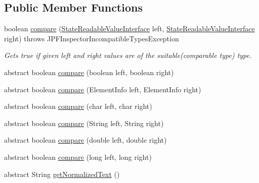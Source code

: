 \subsection*{Public Member Functions}
\begin{DoxyCompactItemize}
\item 
boolean \hyperlink{classgov_1_1nasa_1_1jpf_1_1inspector_1_1server_1_1programstate_1_1relop_1_1_rel_op_equal_base_a89a8988e7ff80fd175542cf45f5f18d3}{compare} (\hyperlink{interfacegov_1_1nasa_1_1jpf_1_1inspector_1_1server_1_1programstate_1_1_state_readable_value_interface}{State\+Readable\+Value\+Interface} left, \hyperlink{interfacegov_1_1nasa_1_1jpf_1_1inspector_1_1server_1_1programstate_1_1_state_readable_value_interface}{State\+Readable\+Value\+Interface} right)  throws J\+P\+F\+Inspector\+Incompatible\+Types\+Exception 
\begin{DoxyCompactList}\small\item\em Gets true if given left and right values are of the suitable(comparable type) type. \end{DoxyCompactList}\item 
abstract boolean \hyperlink{classgov_1_1nasa_1_1jpf_1_1inspector_1_1server_1_1programstate_1_1relop_1_1_rel_op_equal_base_a64fa08d07ac1fe2e0ff61e7d69a4f8ce}{compare} (boolean left, boolean right)
\item 
abstract boolean \hyperlink{classgov_1_1nasa_1_1jpf_1_1inspector_1_1server_1_1programstate_1_1relop_1_1_rel_op_equal_base_a1497fc6f683ff020f501ff91c42d2b68}{compare} (Element\+Info left, Element\+Info right)
\item 
abstract boolean \hyperlink{classgov_1_1nasa_1_1jpf_1_1inspector_1_1server_1_1programstate_1_1relop_1_1_rel_op_equal_base_a2a23028e52beb35842faf1882d0a6f7a}{compare} (char left, char right)
\item 
abstract boolean \hyperlink{classgov_1_1nasa_1_1jpf_1_1inspector_1_1server_1_1programstate_1_1relop_1_1_rel_op_equal_base_a94b1d677b478e59c912cbdf02b03a457}{compare} (String left, String right)
\item 
abstract boolean \hyperlink{classgov_1_1nasa_1_1jpf_1_1inspector_1_1server_1_1programstate_1_1relop_1_1_rel_op_equal_base_ad613ffe9c4edd6b44d5844630104eaa5}{compare} (double left, double right)
\item 
abstract boolean \hyperlink{classgov_1_1nasa_1_1jpf_1_1inspector_1_1server_1_1programstate_1_1relop_1_1_rel_op_equal_base_a480939c8f9e6177537c70ee1b623c8a6}{compare} (long left, long right)
\item 
abstract String \hyperlink{classgov_1_1nasa_1_1jpf_1_1inspector_1_1server_1_1programstate_1_1relop_1_1_rel_op_equal_base_a3817f1f5238378f4f50a1294ea2346ac}{get\+Normalized\+Text} ()
\end{DoxyCompactItemize}
